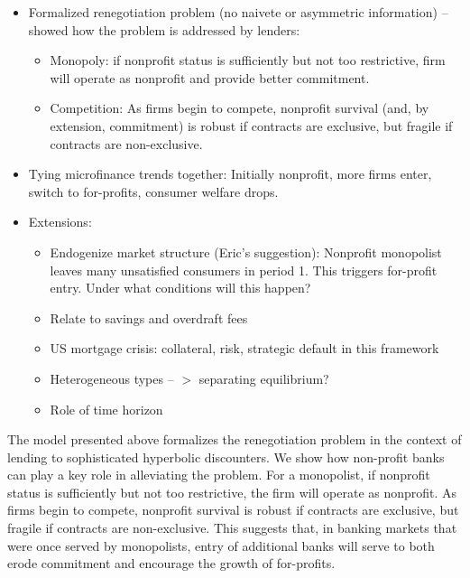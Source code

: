 \documentclass[11pt]{article}%
\begin{document}
{{\begin{itemize}
\item Formalized renegotiation problem (no naivete or asymmetric information)
-- showed how the problem is addressed by lenders:

\begin{itemize}
\item Monopoly: if nonprofit status is sufficiently but not too restrictive,
firm will operate as nonprofit and provide better commitment.

\item Competition: As firms begin to compete, nonprofit survival (and, by
extension, commitment) is robust if contracts are exclusive, but fragile if
contracts are non-exclusive.
\end{itemize}

\item Tying microfinance trends together: Initially nonprofit, more firms
enter, switch to for-profits, consumer welfare drops.

\item Extensions:

\begin{itemize}
\item Endogenize market structure (Eric's suggestion): Nonprofit monopolist
leaves many unsatisfied consumers in period 1. This triggers for-profit entry.
Under what conditions will this happen?

\item Relate to savings and overdraft fees

\item US mortgage crisis: collateral, risk, strategic default in this framework

\item Heterogeneous types --%
$>$
separating equilibrium?

\item Role of time horizon
\end{itemize}
\end{itemize}

\bigskip

The model presented above formalizes the renegotiation problem in the context
of lending to sophisticated hyperbolic discounters. We show how non-profit
banks can play a key role in alleviating the problem. For a monopolist, if
nonprofit status is sufficiently but not too restrictive, the firm will
operate as nonprofit. As firms begin to compete, nonprofit survival is robust
if contracts are exclusive, but fragile if contracts are non-exclusive. This
suggests that, in banking markets that were once served by monopolists, entry
of additional banks will serve to both erode commitment and encourage the
growth of for-profits.

}}
\end{document}
